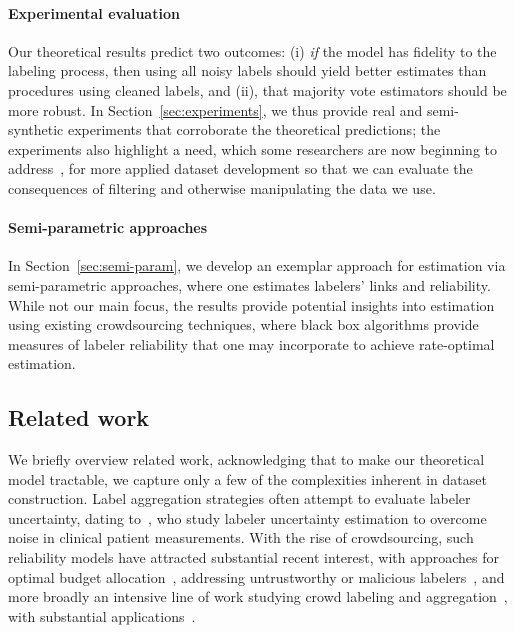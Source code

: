 \documentclass[11pt]{article}
\newcommand{\<}{\langle} %
\renewcommand{\>}{\rangle}
\begin{document}
\paragraph{Experimental evaluation}
Our theoretical results predict two outcomes: (i) \emph{if} the
model has fidelity to the labeling process, then using all noisy labels
should yield better estimates than procedures using cleaned labels, and
(ii), that majority vote estimators should be more robust. In
Section~\ref{sec:experiments}, we thus provide real and semi-synthetic
experiments that corroborate the theoretical predictions; the experiments
also highlight a need, which some researchers are now beginning to
address~\cite{GadreEtAl23}, for more applied dataset development so that we
can evaluate the consequences of filtering and otherwise manipulating the
data we use.

\paragraph{Semi-parametric approaches}
In Section~\ref{sec:semi-param}, we develop an exemplar
approach for estimation via semi-parametric approaches, where
one estimates labelers' links and reliability.
%
While not our main focus, the results provide potential insights into
estimation using existing crowdsourcing techniques, where black box
algorithms provide measures of labeler reliability that one may incorporate
to achieve rate-optimal estimation.


\subsection{Related work}
\label{sec:related-work}

We briefly overview related work, acknowledging that to make our theoretical
model tractable, we capture only a few of the complexities inherent in
dataset construction. Label aggregation strategies often attempt to
evaluate labeler uncertainty, dating to~\citet{DawidSk79}, who study
labeler uncertainty estimation to overcome noise in
clinical patient measurements. With the rise of
crowdsourcing, such reliability models have
attracted substantial recent interest, with approaches for optimal budget
allocation~\cite{KargerOhSh14}, addressing untrustworthy or malicious
labelers~\cite{CharikarStVa17}, and more broadly an intensive line of work
studying crowd labeling and aggregation~\cite{WhitehillWuBeMoRu09,
  WelinderBrPeBe10, TianZh15, RatnerBaEhFrWuRe17}, with substantial
applications~\cite{DengDoSoLiLiFe09, RussakovskyDeSuKrSaMaHuKaKhBeBeFe15}.
\end{document}
